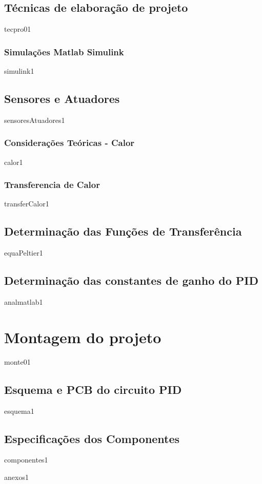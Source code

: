 \documentclass[a4paper, 12pt]{article}
\begin{document}
\subsection{Técnicas de elaboração de projeto}
{tecpro01}

	\subsubsection{Simulações Matlab Simulink }
	{simulink1}
	
\subsection{Sensores e Atuadores}
{sensoresAtuadores1}

	\subsubsection{Considerações Teóricas - Calor }
	{calor1}
	\subsubsection{Transferencia de Calor}
	{transferCalor1}

\subsection{Determinação das Funções de Transferência}
{equaPeltier1}

\subsection{Determinação das constantes de ganho do PID}
{analmatlab1}

\section{Montagem do projeto}
{monte01}

\subsection{Esquema e PCB do circuito PID}
{esquema1}

\subsection{Especificações dos Componentes}
{componentes1}



{}

\newpage
{anexos1}
\end{document}
